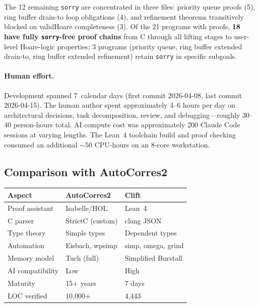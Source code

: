 \documentclass[sigconf,nonacm,screen]{acmart}
\begin{document}
The 12 remaining \texttt{sorry} are concentrated in three files:
priority queue proofs (5), ring buffer drain-to loop obligations (4),
and refinement theorems transitively blocked on validHoare
completeness (3). Of the 21 programs with proofs, \textbf{18 have
fully \texttt{sorry}-free proof chains} from C through all lifting stages to
user-level Hoare-logic properties; 3 programs (priority queue, ring
buffer extended drain-to, ring buffer extended refinement) retain
\texttt{sorry} in specific subgoals.

\paragraph{Human effort.} Development spanned 7~calendar days
(first commit 2026-04-08, last commit 2026-04-15). The human author
spent approximately 4--6 hours per day on architectural decisions,
task decomposition, review, and debugging---roughly 30--40 person-hours
total. AI compute cost was approximately 200 Claude Code sessions
at varying lengths. The Lean~4 toolchain build and proof checking
consumed an additional $\sim$50 CPU-hours on an 8-core workstation.

\subsection{Comparison with AutoCorres2}

\begin{center}
\small
\begin{tabular}{@{}lll@{}}
\toprule
\textbf{Aspect} & \textbf{AutoCorres2} & \textbf{Clift} \\
\midrule
Proof assistant   & Isabelle/HOL      & Lean~4 \\
C parser          & StrictC (custom)  & clang JSON \\
Type theory       & Simple types      & Dependent types \\
Automation        & Eisbach, wpsimp   & simp, omega, grind \\
Memory model      & Tuch (full)       & Simplified Burstall \\
AI compatibility  & Low               & High \\
Maturity          & 15+ years         & 7 days \\
LOC verified      & 10,000+           & 4,443 \\
\bottomrule
\end{tabular}
\end{center}
\end{document}
